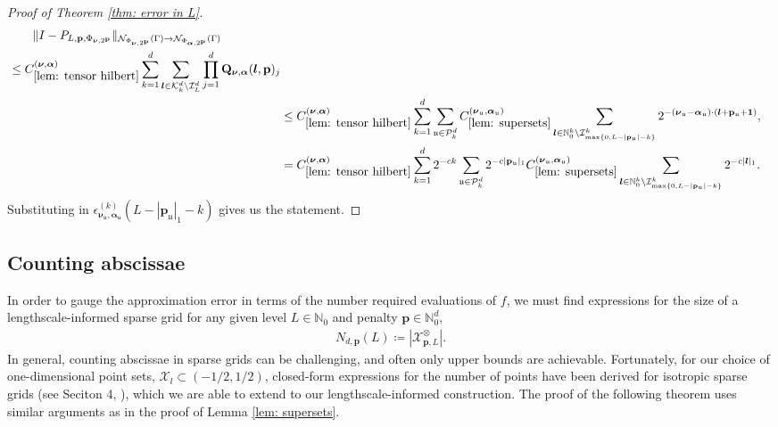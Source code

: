 \documentclass[pdflatex,sn-mathphys-num]{sn-jnl}%
\theoremstyle{thmstyleone}%
\theoremstyle{thmstyletwo}%
\theoremstyle{thmstylethree}%
\begin{document}
\begin{proof}[Proof of Theorem \ref{thm: error in L}]
    \begin{align}
    \begin{split}
    &\qquad\|I-P_{L,\mathbf{p},\Phi_{\boldsymbol{\nu},2^{\mathbf{p}}}}\|_{\mathcal{N}_{\Phi_{\boldsymbol{\nu},2^{\mathbf{p}}}}(\Gamma)\rightarrow\mathcal{N}_{\Phi_{\boldsymbol{\alpha},2^{\mathbf{p}}}}(\Gamma)}\\
    &\leq C^{(\boldsymbol{\nu},\boldsymbol{\alpha})}_{\ref{lem: tensor hilbert}}\sum_{k=1}^d\sum_{\boldsymbol{l}\in\mathcal{K}_k^d\setminus \mathcal{I}^d_L}\prod_{j=1}^d\mathbf{Q}_{\boldsymbol{\nu},\boldsymbol{\alpha}}(\boldsymbol{l},\mathbf{p})_j
    \end{split}\nonumber\\
    &\leq C^{(\boldsymbol{\nu},\boldsymbol{\alpha})}_{\ref{lem: tensor hilbert}}\sum_{k=1}^d\sum_{\mathfrak{u}\in\mathcal{P}^d_k}C_{\ref{lem: supersets}}^{(\boldsymbol{\nu}_{\mathfrak{u}},\boldsymbol{\alpha}_{\mathfrak{u}})}\sum_{\boldsymbol{l}\in\mathbb{N}_0^k\setminus\mathcal{I}_{\max\{0,L-|\mathbf{p}_{\mathfrak{u}}|-k\}}^k}2^{-(\boldsymbol{\nu}_{\mathfrak{u}}-\boldsymbol{\alpha}_{\mathfrak{u}})\cdot(\boldsymbol{l}+\mathbf{p}_{\mathfrak{u}}+\mathbf{1})},\nonumber\\
    &=C^{(\boldsymbol{\nu},\boldsymbol{\alpha})}_{\ref{lem: tensor hilbert}}\sum_{k=1}^d2^{-ck}\sum_{\mathfrak{u}\in\mathcal{P}^d_k}2^{-c|\mathbf{p}_{\mathfrak{u}}|_1}C_{\ref{lem: supersets}}^{(\boldsymbol{\nu}_{\mathfrak{u}},\boldsymbol{\alpha}_{\mathfrak{u}})}\sum_{\boldsymbol{l}\in\mathbb{N}_0^k\setminus\mathcal{I}_{\max\{0,L-|\mathbf{p}_{\mathfrak{u}}|-k\}}^k}2^{-c|\boldsymbol{l}|_1}.\nonumber
    \end{align}
    Substituting in \(\epsilon^{(k)}_{\boldsymbol{\nu}_{\mathfrak{u}},\boldsymbol{\alpha}_{\mathfrak{u}}}(L-|\mathbf{p}_{\mathfrak{u}}|_1 -k)\) gives us the statement.
\end{proof}

\subsection{Counting abscissae}\label{subsec: counting}
In order to gauge the approximation error in terms of the number required evaluations of \(f\), we must find expressions for the size of a lengthscale-informed sparse grid for any given level \(L\in\mathbb{N}_0\) and penalty \(\mathbf{p}\in\mathbb{N}_0^d\),
\begin{align}
    N_{d,\mathbf{p}}(L) \coloneqq |\mathcal{X}^{\otimes}_{\mathbf{p},L}|.\nonumber
\end{align}
In general, counting abscissae in sparse grids can be challenging, and often only upper bounds are achievable. Fortunately, for our choice of one-dimensional point sets, \(\mathcal{X}_l\subset(-1/2,1/2)\), closed-form expressions for the number of points have been derived for isotropic sparse grids (see Seciton 4, \cite{burkhardt2014counting}), which we are able to extend to our lengthscale-informed construction. The proof of the following theorem uses similar arguments as in the proof of Lemma \ref{lem: supersets}.
\end{document}
